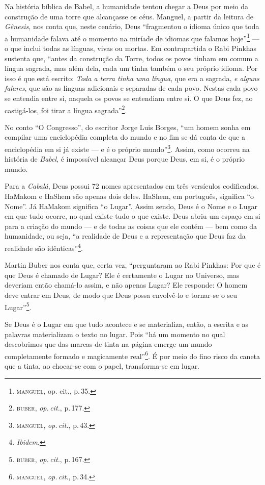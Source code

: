 \noindent{}Na história bíblica de Babel, a humanidade tentou chegar a Deus por meio
da construção de uma torre que alcançasse os céus. Manguel, a partir da
leitura de \emph{Gênesis}, nos conta que, neste cenário, Deus
``fragmentou o idioma único que toda a humanidade falava até o
momento na miríade de idiomas que falamos hoje''\footnote{\textsc{manguel}, op.
  cit., p.\,35.} --- o que inclui todas as línguas, vivas ou mortas. Em
contrapartida o Rabi Pinkhas sustenta que, ``antes da construção
da Torre, todos os povos tinham em comum a língua sagrada, mas além
dela, cada um tinha também o seu próprio idioma. Por isso é que está
escrito: \emph{Toda a terra tinha uma língua}, que era a sagrada, \emph{e alguns
falares}, que são as línguas adicionais e separadas de cada povo. Nestas
cada povo se entendia entre si, naquela os povos se entendiam entre si.
O que Deus fez, ao castigá-los, foi tirar a língua
sagrada''\footnote{\textsc{buber}, \emph{op.\,cit.}, p.\,177.}.

No conto ``O Congresso'', do escritor Jorge Luis Borges, ``um
homem sonha em compilar uma enciclopédia completa do mundo e no fim se
dá conta de que a enciclopédia em si já existe --- e é o próprio
mundo''\footnote{\textsc{manguel}, \emph{op.\,cit.}, p.\,43.}. Assim, como ocorreu na
história de \emph{Babel}, é impossível alcançar Deus porque Deus, em si,
é o próprio mundo.

Para a \emph{Cabalá}, Deus possui 72 nomes apresentados em três
versículos codificados. HaMakom e HaShem são apenas dois deles. HaShem,
em português, significa ``o Nome''. Já HaMakom significa ``o Lugar''.
Assim sendo, Deus é o Nome e o Lugar em que tudo ocorre, no qual existe
tudo o que existe. Deus abriu um espaço em si para a criação do mundo
--- e de todas as coisas que ele contém --- bem como da humanidade, ou
seja, ``a realidade de Deus e a representação que Deus faz da
realidade são idênticas''\footnote{\emph{Ibidem}.}.

Martin Buber nos conta que, certa vez, ``perguntaram ao Rabi
Pinkhas: Por que é que Deus é chamado de Lugar? Ele é certamente o
Lugar no Universo, mas deveriam então chamá-lo assim, e não apenas
Lugar? Ele responde: O homem deve entrar em Deus, de modo que Deus
possa envolvê-lo e tornar-se o seu Lugar''\footnote{\textsc{buber}, \emph{op.\,cit.}, p.\,167.}.

Se Deus é o Lugar em que tudo acontece e se materializa, então, a
escrita e as palavras materializam o texto no lugar. Pois ``há um
momento no qual descobrimos que das marcas de tinta na página emerge um
mundo completamente formado e magicamente real''\footnote{\textsc{manguel}, \emph{op.\,cit.}, p.\,34.}. É por meio do fino risco da caneta que a tinta, ao
chocar-se com o papel, transforma-se em lugar.

